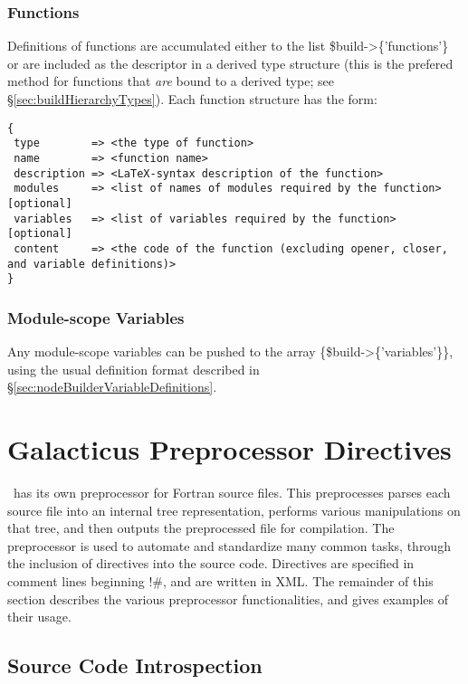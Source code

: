 \subsubsection{Functions}\label{sec:buildHierarchyFunctions}

Definitions of functions are accumulated either to the list {\normalfont \ttfamily \$build->\{'functions'\}} or are included as the {\normalfont \ttfamily descriptor} in a derived type structure (this is the prefered method for functions that \emph{are} bound to a derived type; see \S\ref{sec:buildHierarchyTypes}). Each function structure has the form:
\begin{verbatim}
{
 type        => <the type of function>
 name        => <function name>
 description => <LaTeX-syntax description of the function>
 modules     => <list of names of modules required by the function> [optional]
 variables   => <list of variables required by the function> [optional]
 content     => <the code of the function (excluding opener, closer, and variable definitions)>
}
\end{verbatim}

\subsubsection{Module-scope Variables}

Any module-scope variables can be pushed to the array {\normalfont \ttfamily \@\{\$build->\{'variables'\}\}}, using the usual definition format described in \S\ref{sec:nodeBuilderVariableDefinitions}.

\section{Galacticus Preprocessor Directives}\label{sec:sourceTreePreprocessor}

\glc\ has its own preprocessor for Fortran source files. This preprocesses parses each source file into an internal tree representation, performs various manipulations on that tree, and then outputs the preprocessed file for compilation. The preprocessor is used to automate and standardize many common tasks, through the inclusion of directives into the source code. Directives are specified in comment lines beginning {\normalfont \ttfamily !\#}, and are written in XML. The remainder of this section describes the various preprocessor functionalities, and gives examples of their usage.

\subsection{Source Code Introspection}

